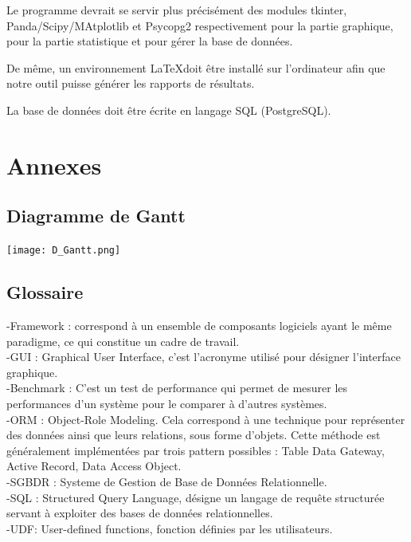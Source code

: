 \documentclass[a4paper]{report}
\begin{document}
Le programme devrait se servir plus précisément des modules tkinter, Panda/Scipy/MAtplotlib et Psycopg2 respectivement pour la partie graphique, pour la partie statistique et pour gérer la base de données.

De même, un environnement \LaTeX  doit être installé sur l'ordinateur afin que notre outil puisse générer les rapports de résultats.

La base de données doit être écrite en langage SQL (PostgreSQL).

\section{Annexes}

\subsection{Diagramme de Gantt}

\begin{center}
\texttt{[image: D\_Gantt.png]}
\end{center}

\subsection{Glossaire}

-Framework : correspond à un ensemble de composants logiciels ayant le même paradigme, ce qui constitue un cadre de travail. \\

-GUI : Graphical User Interface, c'est l'acronyme utilisé pour désigner l'interface graphique. \\

-Benchmark : C'est un test de performance qui permet de mesurer les performances d'un système pour le comparer à d'autres systèmes.\\

-ORM : Object-Role Modeling. Cela correspond à une technique pour représenter des données ainsi que leurs relations, sous forme d'objets. Cette méthode est généralement implémentées par trois pattern possibles : Table Data Gateway, Active Record, Data Access Object.\\

-SGBDR : Systeme de Gestion de Base de Données Relationnelle.\\

-SQL : Structured Query Language, désigne un langage de requête structurée servant à exploiter des bases de données relationnelles.\\

-UDF: User-defined functions, fonction définies par les utilisateurs.\\



\end{document}
